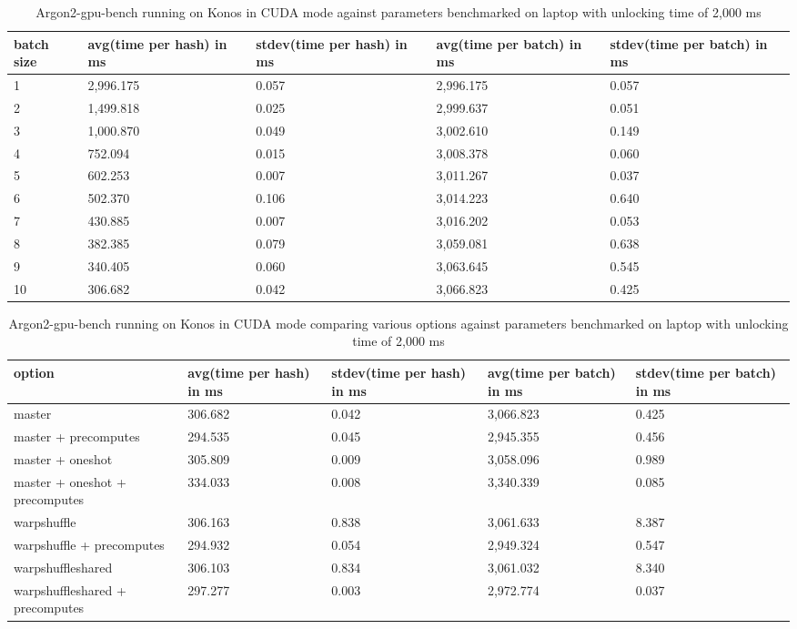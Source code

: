 \documentclass[nolof,digital]{fithesis3}
\begin{document}
\noindent
\begin{table}
\caption{Argon2-gpu-bench running on Konos in CUDA mode against parameters benchmarked on laptop with unlocking time of 2,000 ms}
\label{tab:konosgpu}
\begin{tabularx}{\textwidth}{| X | X | X | X | X |}
\hline
batch size & avg(time per hash) in ms & stdev(time per hash) in ms & avg(time per batch) in ms & stdev(time per batch) in ms\\
\hline
1 & 2,996.175 & 0.057 & 2,996.175 & 0.057\\
\hline
2 & 1,499.818 & 0.025 & 2,999.637 & 0.051\\
\hline
3 & 1,000.870 & 0.049 & 3,002.610 & 0.149\\
\hline
4 & 752.094 & 0.015 & 3,008.378 & 0.060\\
\hline
5 & 602.253 & 0.007 & 3,011.267 & 0.037\\
\hline
6 & 502.370 & 0.106 & 3,014.223 & 0.640\\
\hline
7 & 430.885 & 0.007 & 3,016.202 & 0.053\\
\hline
8 & 382.385 & 0.079 & 3,059.081 & 0.638\\
\hline
9 & 340.405 & 0.060 & 3,063.645 & 0.545\\
\hline
10 & 306.682 & 0.042 & 3,066.823 & 0.425\\
\hline
\end{tabularx}
\end{table}


\noindent
\begin{table}
\caption{Argon2-gpu-bench running on Konos in CUDA mode comparing various options against parameters benchmarked on laptop with unlocking time of 2,000 ms}
\label{tab:konosgpuopt}
\begin{tabularx}{\textwidth}{| X | X | X | X | X |}
\hline
option & avg(time per hash) in ms & stdev(time per hash) in ms & avg(time per batch) in ms & stdev(time per batch) in ms\\
\hline
master & 306.682 & 0.042 & 3,066.823 & 0.425 \\
\hline
master + precomputes & 294.535 & 0.045 & 2,945.355 & 0.456 \\
\hline
master + oneshot & 305.809 & 0.009 & 3,058.096 & 0.989 \\
\hline
master + oneshot + precomputes & 334.033 & 0.008 & 3,340.339 & 0.085 \\
\hline
warp\-shuffle & 306.163 & 0.838 & 3,061.633 & 8.387 \\
\hline
warpshuffle + precomputes & 294.932 & 0.054 & 2,949.324 & 0.547\\
\hline
warp\-shuffle\-shared & 306.103 & 0.834 & 3,061.032 & 8.340\\
\hline
warp\-shuffle\-shared + precomputes & 297.277 & 0.003 & 2,972.774 & 0.037\\
\hline
\end{tabularx}
\end{table}
\end{document}
